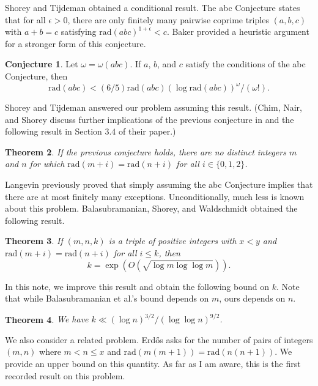 \documentclass{article}
\theoremstyle{plain}
\newtheorem{thm}{Theorem}
\theoremstyle{definition}
\newtheorem{conj}[thm]{Conjecture}
\begin{document}
Shorey and Tijdeman \cite{ST} obtained a conditional result. The abc Conjecture states that for all $\epsilon > 0$, there are only finitely many pairwise coprime triples $(a, b, c)$ with $a + b = c$ satisfying $\textrm{rad} (abc)^{1 + \epsilon} < c$. Baker \cite{B} provided a heuristic argument for a stronger form of this conjecture.

\begin{conj} Let $\omega = \omega(abc)$. If $a$, $b$, and $c$ satisfy the conditions of the abc Conjecture, then
\[\textrm{rad} (abc) < (6/5) \textrm{rad} (abc) (\log \textrm{rad} (abc))^\omega/(\omega !).\]
\end{conj}

Shorey and Tijdeman answered our problem assuming this result. (Chim, Nair, and Shorey discuss further implications of the previous conjecture in \cite{CNS} and the following result in Section $3.4$ of their paper.)

\begin{thm} If the previous conjecture holds, there are no distinct integers $m$ and $n$ for which $\textrm{rad} (m + i) = \textrm{rad} (n + i)$ for all $i \in \{0, 1, 2\}$.
\end{thm}

Langevin \cite{L} previously proved that simply assuming the abc Conjecture implies that there are at most finitely many exceptions. Unconditionally, much less is known about this problem. Balasubramanian, Shorey, and Waldschmidt \cite{Bal+} obtained the following result.

\begin{thm} \label{main thm} If $(m, n, k)$ is a triple of positive integers with $x < y$ and $\textrm{rad} (m + i) = \textrm{rad} (n + i)$ for all $i \leq k$, then
\[k = \exp(O(\sqrt{\log m \log \log m})).\]
\end{thm}

In this note, we improve this result and obtain the following bound on $k$. Note that while Balasubramanian et al.'s bound depends on $m$, ours depends on $n$.

\begin{thm} \label{main} We have $k \ll (\log n)^{3/2}/(\log \log n)^{9/2}$.
\end{thm}

We also consider a related problem. Erd{\H o}s \cite{E2} asks for the number of pairs of integers $(m, n)$ where $m < n \leq x$ and $\textrm{rad} (m(m + 1)) = \textrm{rad} (n(n + 1))$. We provide an upper bound on this quantity. As far as I am aware, this is the first recorded result on this problem.
\end{document}
